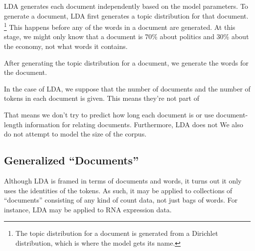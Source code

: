 LDA generates each document independently based on the model
parameters.  To generate a document, LDA first generates a topic
distribution for that document.%
%
\footnote{The topic distribution for a document is generated from
a Dirichlet distribution, which is where the model gets its name.}
%
This happens before any of the words in a document are generated.  At
this stage, we might only know that a document is 70\% about politics
and 30\% about the economy, not what words it contains.

After generating the topic distribution for a document, we generate
the words for the document.  

In the case of LDA, we suppose that the number of documents and the
number of tokens in each document is given.  This means they're
not part of 

That means we don't try
to predict how long each document is or use document-length
information for relating documents.  Furthermore, LDA does not We also do not attempt to model
the size of the corpus.


\subsection{Generalized ``Documents''}

Although LDA is framed in terms of documents and words, it turns out
it only uses the identities of the tokens.  As such, it may be applied
to collections of ``documents'' consisting of any kind of count data,
not just bags of words.  For instance, LDA may be applied to RNA
expression data.

